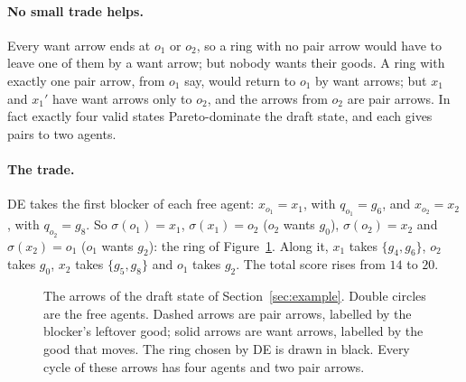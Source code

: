 \documentclass[runningheads,11pt]{llncs}
\newcommand{\DE}{\textup{DE}}
\begin{document}
\paragraph{No small trade helps.} Every want arrow ends at $o_1$ or $o_2$, so a ring with no pair arrow would have to leave one of them by a want arrow; but nobody wants their goods. A ring with exactly one pair arrow, from $o_1$ say, would return to $o_1$ by want arrows; but $x_1$ and $x_1'$ have want arrows only to $o_2$, and the arrows from $o_2$ are pair arrows. In fact exactly four valid states Pareto-dominate the draft state, and each gives pairs to two agents.

\paragraph{The trade.} \DE{} takes the first blocker of each free agent: $x_{o_1}=x_1$, with $q_{o_1}=g_6$, and $x_{o_2}=x_2$, with $q_{o_2}=g_8$. So $\sigma(o_1)=x_1$, $\sigma(x_1)=o_2$ ($o_2$ wants $g_0$), $\sigma(o_2)=x_2$ and $\sigma(x_2)=o_1$ ($o_1$ wants $g_2$): the ring of Figure~\ref{fig:cycle}. Along it, $x_1$ takes $\{g_4,g_6\}$, $o_2$ takes $g_0$, $x_2$ takes $\{g_5,g_8\}$ and $o_1$ takes $g_2$. The total score rises from $14$ to $20$.

\begin{figure}[tb]
\centering
{}
\caption{The arrows of the draft state of Section~\ref{sec:example}. Double circles are the free agents. Dashed arrows are pair arrows, labelled by the blocker's leftover good; solid arrows are want arrows, labelled by the good that moves. The ring chosen by \DE{} is drawn in black. Every cycle of these arrows has four agents and two pair arrows.}\label{fig:cycle}
\end{figure}
\end{document}
